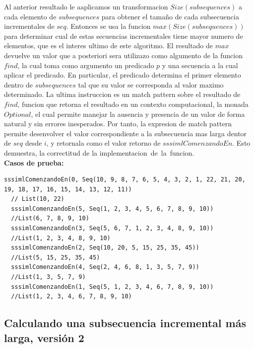 \documentclass[12pt, a4paper]{article}
\begin{document}
   Al anterior resultado le aaplicamos un transformacion $Size(subsequences)$ a cada elemento de $subsequences$ para obtener
   el tamaño de cada subsecuencia incrementales de $seq$. Entonces se usa la funcion $max(Size(subsequences))$ para determinar
   cual de estas secuencias incrementales tiene mayor numero de elementos, que es el interes ultimo de este algoritmo.
   El resultado de $max$ devuelve un valor que a posteriori sera utilizazo como algumento de la funcion $find$, la cual toma como
   argumento un predicado $p$ y una secuencia a la cual aplicar el predicado. En particular, el predicado determina el
   primer elemento dentro de $subsequences$ tal que su valor se corresponda al valor maximo determinado.
   La ultima instruccion es un match pattern sobre el resultado de $find$, funcion que retorna el resultado en un contexto computacional,
   la monada $Optional$, el cual permite manejar la ausencia y presencia de un valor de forma natural y sin errores inesperados.
   Por tanto, la expresion de match pattern permite desenvolver el valor correspondiente a  la subsecuencia mas larga dentor de $seq$ desde $i$,
   y retornala como el valor retorno de $sssimlComenzandoEn$. Esto demuestra, la correctitud de la implementacion de la funcion. \\
\textbf{Casos de prueba: \\}
\begin{lstlisting}[caption=Casos de prueba para la función sssimlComenzandoEn, label=lst:scala_code]
  sssimlComenzandoEn(0, Seq(10, 9, 8, 7, 6, 5, 4, 3, 2, 1, 22, 21, 20, 19, 18, 17, 16, 15, 14, 13, 12, 11))
  // List(10, 22)
  sssimlComenzandoEn(5, Seq(1, 2, 3, 4, 5, 6, 7, 8, 9, 10))
  //List(6, 7, 8, 9, 10)
  sssimlComenzandoEn(3, Seq(5, 6, 7, 1, 2, 3, 4, 8, 9, 10)) 
  //List(1, 2, 3, 4, 8, 9, 10)
  sssimlComenzandoEn(2, Seq(10, 20, 5, 15, 25, 35, 45)) 
  //List(5, 15, 25, 35, 45)
  sssimlComenzandoEn(4, Seq(2, 4, 6, 8, 1, 3, 5, 7, 9))
  //List(1, 3, 5, 7, 9)
  sssimlComenzandoEn(1, Seq(5, 1, 2, 3, 4, 6, 7, 8, 9, 10))
  //List(1, 2, 3, 4, 6, 7, 8, 9, 10)
\end{lstlisting}

\subsection{Calculando una subsecuencia incremental más larga, versión 2}
\end{document}

